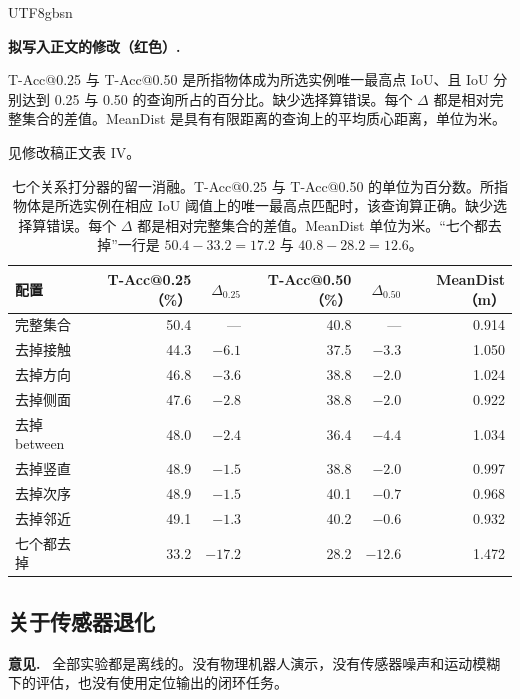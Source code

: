 \documentclass[11pt]{article}
\newcommand{\revcomment}[1]{%
  \par\vspace{0.6em}\noindent\textcolor{revblue}{\textbf{意见.}}\ %
  \textcolor{revblue}{#1}\par\vspace{0.4em}}
\newcommand{\revchange}[1]{%
  \par\noindent\textbf{拟写入正文的修改（红色）.}\par
  \noindent\textcolor{revred}{#1}\par\vspace{0.8em}}
\begin{document}
\begin{CJK*}{UTF8}{gbsn}
\revchange{T-Acc@0.25 与 T-Acc@0.50 是所指物体成为所选实例唯一最高点 IoU、且 IoU 分别达到 0.25 与 0.50 的查询所占的百分比。缺少选择算错误。每个 \(\Delta\) 都是相对完整集合的差值。MeanDist 是具有有限距离的查询上的平均质心距离，单位为米。}

\noindent 见修改稿正文表 IV。

\begin{table}[ht]
\centering
\caption{七个关系打分器的留一消融。T-Acc@0.25 与 T-Acc@0.50 的单位为百分数。所指物体是所选实例在相应 IoU 阈值上的唯一最高点匹配时，该查询算正确。缺少选择算错误。每个 \(\Delta\) 都是相对完整集合的差值。MeanDist 单位为米。“七个都去掉”一行是 \(50.4-33.2=17.2\) 与 \(40.8-28.2=12.6\)。}
\label{tab:scorers}
\small
\begin{tabular}{lrrrrr}
\toprule
配置 & T-Acc@0.25（\%） & \(\Delta_{0.25}\) & T-Acc@0.50（\%） & \(\Delta_{0.50}\) & MeanDist（m） \\
\midrule
完整集合 & 50.4 & --- & 40.8 & --- & 0.914 \\
去掉接触 & 44.3 & \(-6.1\) & 37.5 & \(-3.3\) & 1.050 \\
去掉方向 & 46.8 & \(-3.6\) & 38.8 & \(-2.0\) & 1.024 \\
去掉侧面 & 47.6 & \(-2.8\) & 38.8 & \(-2.0\) & 0.922 \\
去掉 between & 48.0 & \(-2.4\) & 36.4 & \(-4.4\) & 1.034 \\
去掉竖直 & 48.9 & \(-1.5\) & 38.8 & \(-2.0\) & 0.997 \\
去掉次序 & 48.9 & \(-1.5\) & 40.1 & \(-0.7\) & 0.968 \\
去掉邻近 & 49.1 & \(-1.3\) & 40.2 & \(-0.6\) & 0.932 \\
七个都去掉 & 33.2 & \(-17.2\) & 28.2 & \(-12.6\) & 1.472 \\
\bottomrule
\end{tabular}
\end{table}

\subsection*{关于传感器退化}

\revcomment{全部实验都是离线的。没有物理机器人演示，没有传感器噪声和运动模糊下的评估，也没有使用定位输出的闭环任务。}


\end{CJK*}
\end{document}
